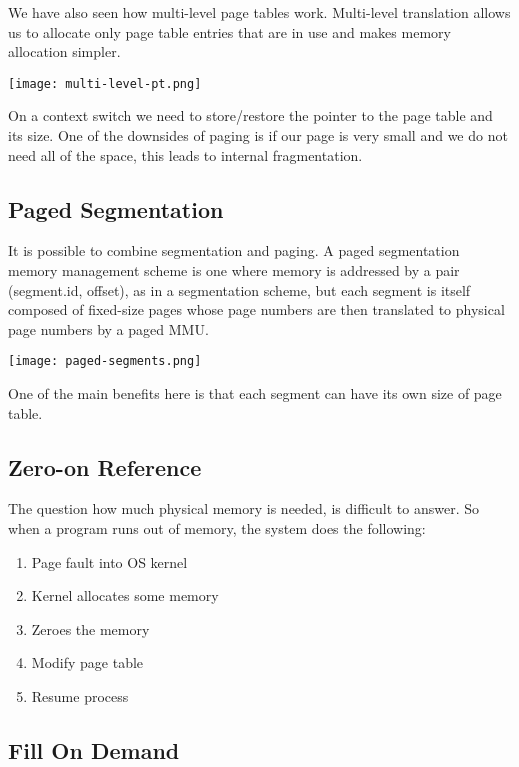 We have also seen how multi-level page tables work. Multi-level translation allows us to allocate only page table entries that are in use and makes memory allocation simpler.
\begin{center}
	\texttt{[image: multi-level-pt.png]}
\end{center}

On a context switch we need to store/restore the pointer to the page table and its size. One of the downsides of paging is if our page is very small and we do not need all of the space, this leads to internal fragmentation.


\subsection{Paged Segmentation}

It is possible to combine segmentation and paging. A paged segmentation memory management scheme is one where memory is addressed by a pair (segment.id, offset), as in a segmentation scheme, but each segment is itself composed of fixed-size pages whose page numbers are then translated to physical page numbers by a paged MMU.
\begin{center}
	\texttt{[image: paged-segments.png]}
\end{center}

One of the main benefits here is that each segment can have its own size of page table.


\subsection{Zero-on Reference}

The question how much physical memory is needed, is difficult to answer. So when a program runs out of memory, the system does the following:
\begin{enumerate}
	\item Page fault into OS kernel
	\item Kernel allocates some memory
	\item Zeroes the memory
	\item Modify page table
	\item Resume process
\end{enumerate}


\subsection{Fill On Demand}

